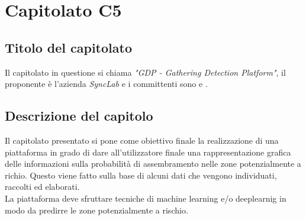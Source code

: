 \section{Capitolato C5}
\subsection{Titolo del capitolato}
Il capitolato in questione si chiama \textit{"GDP - Gathering Detection Platform"}, il proponente \`e l'azienda \textit{SyncLab} e i committenti sono \VT{} e \CR{}.

\subsection{Descrizione del capitolo}
Il capitolato presentato si pone come obiettivo finale la realizzazione di una piattaforma in grado di dare all'utilizzatore finale una rappresentazione grafica delle informazioni sulla probabilità di assembramento nelle zone potenzialmente a richio. Questo viene fatto sulla base di alcuni dati che vengono individuati, raccolti ed elaborati. \\
La piattaforma deve sfruttare tecniche di machine learning e/o deeplearnig in modo da predirre le zone potenzialmente a rischio.

